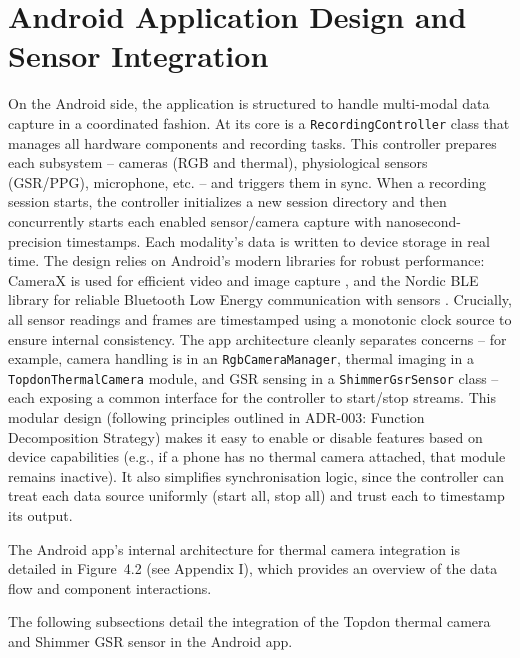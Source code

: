 \section{Android Application Design and Sensor Integration}\label{sec:4-2}
On the Android side, the application is structured to handle multi-modal data capture in a coordinated fashion. At its core is a \texttt{RecordingController} class that manages all hardware components and recording tasks. This controller prepares each subsystem -- cameras (RGB and thermal), physiological sensors (GSR/PPG), microphone, etc. -- and triggers them in sync. When a recording session starts, the controller initializes a new session directory and then concurrently starts each enabled sensor/camera capture with nanosecond-precision timestamps. Each modality's data is written to device storage in real time. The design relies on Android's modern libraries for robust performance: CameraX is used for efficient video and image capture \citep{ref13}, and the Nordic BLE library for reliable Bluetooth Low Energy communication with sensors \citep{ref14}. Crucially, all sensor readings and frames are timestamped using a monotonic clock source to ensure internal consistency. The app architecture cleanly separates concerns -- for example, camera handling is in an \texttt{RgbCameraManager}, thermal imaging in a \texttt{TopdonThermalCamera} module, and GSR sensing in a \texttt{ShimmerGsrSensor} class -- each exposing a common interface for the controller to start/stop streams. This modular design (following principles outlined in ADR-003: Function Decomposition Strategy) makes it easy to enable or disable features based on device capabilities (e.g., if a phone has no thermal camera attached, that module remains inactive). It also simplifies synchronisation logic, since the controller can treat each data source uniformly (start all, stop all) and trust each to timestamp its output.

The Android app's internal architecture for thermal camera integration is detailed in Figure~4.2 (see Appendix I), which provides an overview of the data flow and component interactions.

The following subsections detail the integration of the Topdon thermal camera and Shimmer GSR sensor in the Android app.

